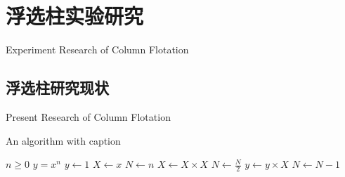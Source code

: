 \chapter{浮选柱实验研究}{Experiment Research of Column Flotation}
\section{浮选柱研究现状}{Present Research of Column Flotation}
\begin{algorithm}
    \caption{An algorithm with caption}\label{alg:cap}
    \begin{algorithmic}[1]
        \Require $n \geq 0$
        \Ensure $y = x^n$
        \State $y \gets 1$
        \State $X \gets x$
        \State $N \gets n$
            \State $X \gets X \times X$
            \State $N \gets \frac{N}{2}$  
            \State $y \gets y \times X$
            \State $N \gets N - 1$
        \EndIf
        \EndWhile
    \end{algorithmic}
\end{algorithm}